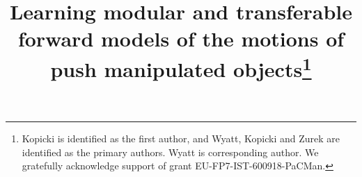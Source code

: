 %
%
%
%
%
%
\RequirePackage{fix-cm}
%
\documentclass[natbib,twocolumn]{svjour3}          %
%
\smartqed  %
%
\usepackage{graphicx}
%
%
\usepackage{amsmath,amssymb,amsbsy}
\usepackage{algorithm}
\usepackage{graphicx}
\usepackage{epstopdf}
\usepackage{algorithmic}
\usepackage{stackengine}

%
\newcommand{\Ex}{\mathop{\mathbb E\/}}
\newcommand{\argmax}[1]{\underset{#1}{\operatorname{argmax}}\medspace}

%


\title{Learning modular and transferable forward models of the motions of push manipulated objects\thanks{Kopicki is identified as the first author, and Wyatt, Kopicki and Zurek are identified as the primary authors. Wyatt is corresponding author. We gratefully acknowledge support of grant EU-FP7-IST-600918-PaCMan.}
}

